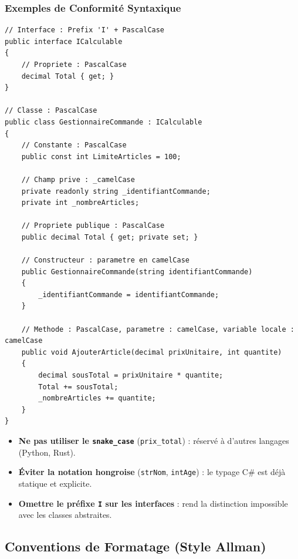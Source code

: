 \subsubsection{Exemples de Conformité Syntaxique}

\begin{lstlisting}[caption={Conventions de nommage recommandées en C\#}]
// Interface : Prefix 'I' + PascalCase
public interface ICalculable
{
    // Propriete : PascalCase
    decimal Total { get; }
}

// Classe : PascalCase
public class GestionnaireCommande : ICalculable
{
    // Constante : PascalCase
    public const int LimiteArticles = 100;

    // Champ prive : _camelCase
    private readonly string _identifiantCommande;
    private int _nombreArticles;

    // Propriete publique : PascalCase
    public decimal Total { get; private set; }

    // Constructeur : parametre en camelCase
    public GestionnaireCommande(string identifiantCommande)
    {
        _identifiantCommande = identifiantCommande;
    }

    // Methode : PascalCase, parametre : camelCase, variable locale : camelCase
    public void AjouterArticle(decimal prixUnitaire, int quantite)
    {
        decimal sousTotal = prixUnitaire * quantite;
        Total += sousTotal;
        _nombreArticles += quantite;
    }
}
\end{lstlisting}

\begin{tcolorbox}[colback=backcolour,colframe=codegray,title=\textbf{Pièges de nommage à éviter}]
    \begin{itemize}
        \item \textbf{Ne pas utiliser le \texttt{snake\_case}} (\texttt{prix\_total}) : réservé à d'autres langages (Python, Rust).
        \item \textbf{Éviter la notation hongroise} (\texttt{strNom}, \texttt{intAge}) : le typage C\# est déjà statique et explicite.
        \item \textbf{Omettre le préfixe \texttt{I} sur les interfaces} : rend la distinction impossible avec les classes abstraites.
    \end{itemize}
\end{tcolorbox}



\subsection{Conventions de Formatage (Style Allman)}

